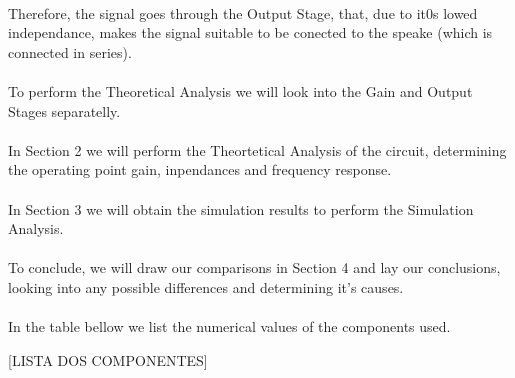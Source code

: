 \paragraph{} Therefore, the signal goes through the Output Stage, that, due to it0s lowed independance, makes the signal suitable to be conected to the speake (which is connected in series).

\paragraph{} To perform the Theoretical Analysis we will look into the Gain and Output Stages separatelly.

\paragraph{} In Section 2 we will perform the Theortetical Analysis of the circuit, determining the operating point gain, inpendances and frequency response.

\paragraph{} In Section 3 we will obtain the simulation results to perform the Simulation Analysis.

\paragraph{} To conclude, we will draw our comparisons in Section 4 and lay our conclusions, looking into any possible differences and determining it's causes.

\paragraph{} In the table bellow we list the numerical values of the components used.

[LISTA DOS COMPONENTES]

\clearpage
